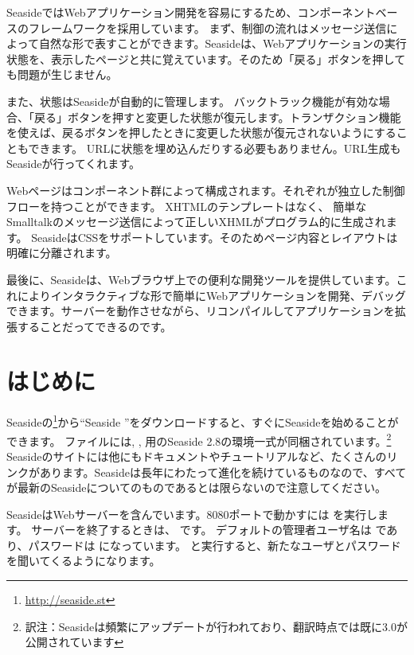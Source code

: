 \documentclass[a4paper,10pt,twoside]{book}
\begin{document}
SeasideではWebアプリケーション開発を容易にするため、コンポーネントベースのフレームワークを採用しています。
まず、制御の流れはメッセージ送信によって自然な形で表すことができます。Seasideは、Webアプリケーションの実行状態を、表示したページと共に覚えています。そのため「戻る」ボタンを押しても問題が生じません。

また、状態はSeasideが自動的に管理します。
バックトラック機能が有効な場合、「戻る」ボタンを押すと変更した状態が復元します。トランザクション機能を使えば、戻るボタンを押したときに変更した状態が復元されないようにすることもできます。
URLに状態を埋め込んだりする必要もありません。URL生成もSeasideが行ってくれます。

Webページはコンポーネント群によって構成されます。それぞれが独立した制御フローを持つことができます。
XHTMLのテンプレートはなく、 簡単なSmalltalkのメッセージ送信によって正しいXHMLがプログラム的に生成されます。
SeasideはCSSをサポートしています。そのためページ内容とレイアウトは明確に分離されます。

最後に、Seasideは、Webブラウザ上での便利な開発ツールを提供しています。これによりインタラクティブな形で簡単にWebアプリケーションを開発、デバッグできます。サーバーを動作させながら、リコンパイルしてアプリケーションを拡張することだってできるのです。
\section{はじめに}

Seasideの\footnote{\url{http://seaside.st}}から``Seaside ''をダウンロードすると、すぐにSeasideを始めることができます。
ファイルには, ,  用のSeaside 2.8の環境一式が同梱されています。\footnote{訳注：Seasideは頻繁にアップデートが行われており、翻訳時点では既に3.0が公開されています}
Seasideのサイトには他にもドキュメントやチュートリアルなど、たくさんのリンクがあります。Seasideは長年にわたって進化を続けているものなので、すべてが最新のSeasideについてのものであるとは限らないので注意してください。


SeasideはWebサーバーを含んでいます。8080ポートで動かすには   を実行します。
サーバーを終了するときは、 です。
デフォルトの管理者ユーザ名は  であり、パスワードは になっています。
   と実行すると、新たなユーザとパスワードを聞いてくるようになります。
\end{document}
